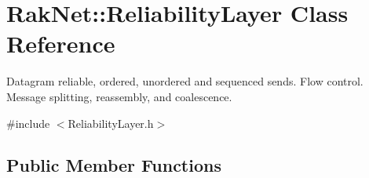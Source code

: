 \hypertarget{class_rak_net_1_1_reliability_layer}{\section{Rak\-Net\-:\-:Reliability\-Layer Class Reference}
\label{class_rak_net_1_1_reliability_layer}
}


Datagram reliable, ordered, unordered and sequenced sends. Flow control. Message splitting, reassembly, and coalescence.  




{\ttfamily \#include $<$Reliability\-Layer.\-h$>$}

\subsection*{Public Member Functions}
